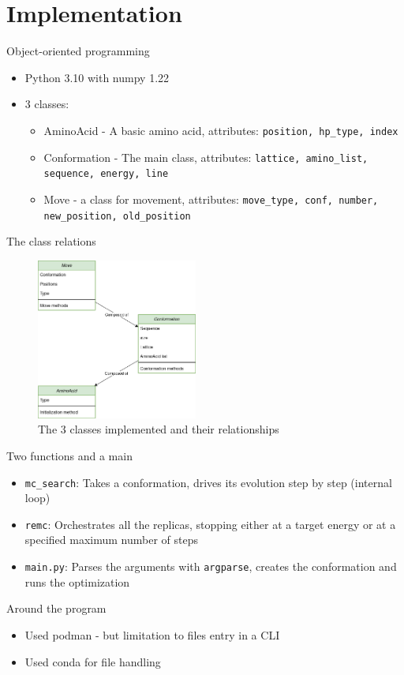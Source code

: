 \documentclass[presentation]{beamer}
\begin{document}
\section{Implementation}
\label{sec:org11e5732}
\begin{frame}[label={sec:org7d889c4},fragile]{Object-oriented programming}
 \begin{itemize}
\item Python 3.10 with numpy 1.22
\pause
\item 3 classes:
\begin{itemize}
\item AminoAcid - A basic amino acid, attributes: \texttt{position, hp\_type, index}
\item Conformation - The main class, attributes: \texttt{lattice, amino\_list, sequence, energy, line}
\item Move - a class for movement, attributes: \texttt{move\_type, conf, number, new\_position, old\_position}
\end{itemize}
\end{itemize}
\end{frame}
\begin{frame}[label={sec:orgdc742af}]{The class relations}
\begin{figure}[htbp]
\centering
\includegraphics[width=200px]{./classes.png}
\caption{\label{fig:cls}The 3 classes implemented and their relationships}
\end{figure}
\end{frame}
\begin{frame}[label={sec:org629fdc9},fragile]{Two functions and a main}
 \begin{itemize}
\item \texttt{mc\_search}: Takes a conformation, drives its evolution step by step (internal loop)
\pause
\item \texttt{remc}: Orchestrates all the replicas, stopping either at a target energy or at a specified maximum number of steps
\pause
\item \texttt{main.py}: Parses the arguments with \texttt{argparse}, creates the conformation and runs the optimization
\end{itemize}
\end{frame}
\begin{frame}[label={sec:org64becc6}]{Around the program}
\begin{itemize}
\item Used podman - but limitation to files entry in a CLI
\item Used conda for file handling
\end{itemize}
\end{frame}
\end{document}
